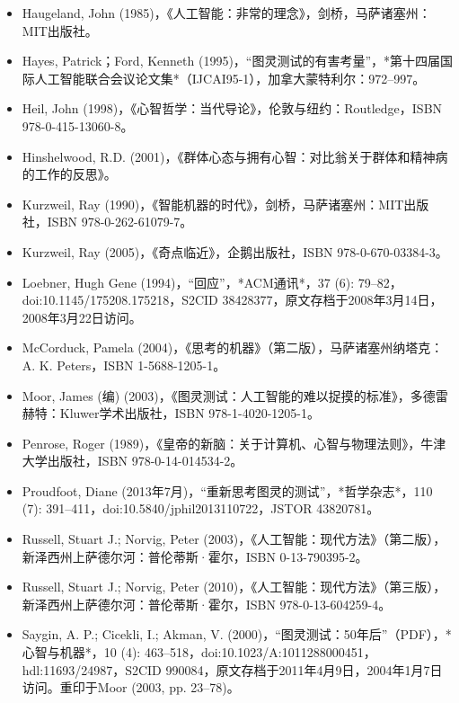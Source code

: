 \begin{itemize}
\item Haugeland, John (1985)，《人工智能：非常的理念》，剑桥，马萨诸塞州：MIT出版社。
\item Hayes, Patrick；Ford, Kenneth (1995)，“图灵测试的有害考量”，*第十四届国际人工智能联合会议论文集*（IJCAI95-1），加拿大蒙特利尔：972–997。
\item Heil, John (1998)，《心智哲学：当代导论》，伦敦与纽约：Routledge，ISBN 978-0-415-13060-8。
\item Hinshelwood, R.D. (2001)，《群体心态与拥有心智：对比翁关于群体和精神病的工作的反思》。
\item Kurzweil, Ray (1990)，《智能机器的时代》，剑桥，马萨诸塞州：MIT出版社，ISBN 978-0-262-61079-7。
\item Kurzweil, Ray (2005)，《奇点临近》，企鹅出版社，ISBN 978-0-670-03384-3。
\item Loebner, Hugh Gene (1994)，“回应”，*ACM通讯*，37 (6): 79–82，doi:10.1145/175208.175218，S2CID 38428377，原文存档于2008年3月14日，2008年3月22日访问。
\item McCorduck, Pamela (2004)，《思考的机器》（第二版），马萨诸塞州纳塔克：A. K. Peters，ISBN 1-5688-1205-1。
\item Moor, James (编) (2003)，《图灵测试：人工智能的难以捉摸的标准》，多德雷赫特：Kluwer学术出版社，ISBN 978-1-4020-1205-1。
\item Penrose, Roger (1989)，《皇帝的新脑：关于计算机、心智与物理法则》，牛津大学出版社，ISBN 978-0-14-014534-2。
\item Proudfoot, Diane (2013年7月)，“重新思考图灵的测试”，*哲学杂志*，110 (7): 391–411，doi:10.5840/jphil2013110722，JSTOR 43820781。
\item Russell, Stuart J.; Norvig, Peter (2003)，《人工智能：现代方法》（第二版），新泽西州上萨德尔河：普伦蒂斯·霍尔，ISBN 0-13-790395-2。
\item Russell, Stuart J.; Norvig, Peter (2010)，《人工智能：现代方法》（第三版），新泽西州上萨德尔河：普伦蒂斯·霍尔，ISBN 978-0-13-604259-4。
\item Saygin, A. P.; Cicekli, I.; Akman, V. (2000)，“图灵测试：50年后”（PDF），*心智与机器*，10 (4): 463–518，doi:10.1023/A:1011288000451，hdl:11693/24987，S2CID 990084，原文存档于2011年4月9日，2004年1月7日访问。重印于Moor (2003, pp. 23–78)。
\end{itemize}